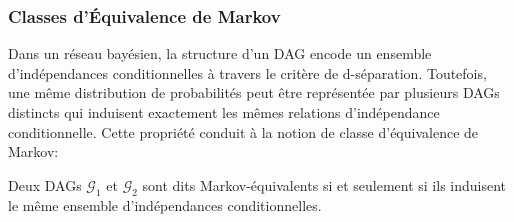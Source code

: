 \documentclass{article}
\begin{document}
\subsubsection{Classes d'Équivalence de Markov}


Dans un réseau bayésien, la structure d'un DAG encode un ensemble d'indépendances conditionnelles à travers le
critère de d-séparation. Toutefois, une même distribution de probabilités peut être représentée par plusieurs
DAGs distincts qui induisent exactement les mêmes relations d'indépendance conditionnelle. Cette propriété
conduit à la notion de classe d'équivalence de Markov:

\begin{center}
    Deux DAGs $\mathcal{G}_1$ et $\mathcal{G}_2$ sont dits Markov-équivalents si et seulement si ils induisent le
    même ensemble d'indépendances conditionnelles.
\end{center}
\end{document}
